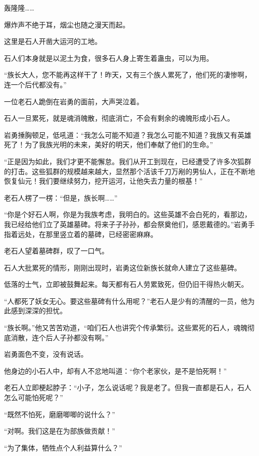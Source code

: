 
\begin{this_body}

轰隆隆……

爆炸声不绝于耳，烟尘也随之漫天而起。

这里是石人开凿大运河的工地。

石人们本身就是以泥土为食，很多石人身上寄生着蛊虫，可以为用。

“族长大人，您不能再这样干了！昨天，又有三个族人累死了，他们死的凄惨啊，连一个后代都没有。”

一位老石人跪倒在岩勇的面前，大声哭泣着。

石人一旦累死，就是魂消魄散，彻底消亡，不会有剩余的魂魄形成小石人。

岩勇捶胸顿足，低吼道：“我怎么可能不知道？我怎么可能不知道？我族又有英雄死了！为了我族光明的未来，美好的明天，他们奉献了他们的生命。”

“正是因为如此，我们才更不能懈怠。我们从开工到现在，已经遭受了许多次狐群的打击。这些狐群的规模越来越大，显然那个活该千刀万剐的男仙人，正在不断地恢复仙元！我们要继续努力，挖开运河，让他失去力量的根基！”

老石人楞了一楞：“但是，族长啊……”

“你是个好石人啊，你是为我族考虑，我明白的。这些英雄不会白死的，看那边，我已经给他们立了英雄墓碑。将来子子孙孙，都会祭奠他们，感恩戴德的。”岩勇手指着远处，在那里竖立着的墓碑，已经密密麻麻。

老石人望着墓碑群，叹了一口气。

石人大批累死的情形，刚刚出现时，岩勇这位新族长就命人建立了这些墓碑。

低落的士气，立即被鼓舞起来。每天都有石人劳累致死，但仍旧干得热火朝天。

“人都死了妖女无心。要这些墓碑有什么用呢？”老石人是少有的清醒的一员，他为此感到深深的担忧。

“族长啊。”他又苦苦劝道，“咱们石人也讲究个传承繁衍。这些累死的石人，魂魄彻底消散，连个后人子孙都没有啊。”

岩勇面色不变，没有说话。

他身边的小石人中，却有人不忿地叫道：“你个老家伙，是不是怕死啊！”

老石人立即梗起脖子：“小子，怎么说话呢？我是老了。但我一直都是石人，石人怎么可能怕死呢？”

“既然不怕死，磨磨唧唧的说什么？”

“对啊。我们这是在为部族做贡献！”

“为了集体，牺牲点个人利益算什么？”


\end{this_body}
